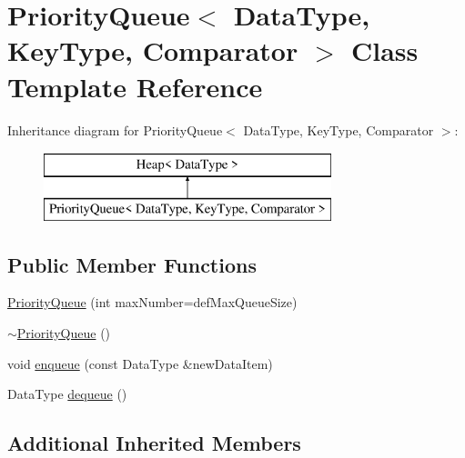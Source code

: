\hypertarget{class_priority_queue}{\section{Priority\+Queue$<$ Data\+Type, Key\+Type, Comparator $>$ Class Template Reference}
\label{class_priority_queue}
}
Inheritance diagram for Priority\+Queue$<$ Data\+Type, Key\+Type, Comparator $>$\+:\begin{figure}[H]
\begin{center}
\leavevmode
\includegraphics[height=2.000000cm]{class_priority_queue}
\end{center}
\end{figure}
\subsection*{Public Member Functions}
\begin{DoxyCompactItemize}
\item 
\hyperlink{class_priority_queue_a47de2a46cff1d6a6ed30a99c94dc1b14}{Priority\+Queue} (int max\+Number=def\+Max\+Queue\+Size)
\item 
\hyperlink{class_priority_queue_a7d959dc823b18c647aa0ee4a80f27881}{$\sim$\+Priority\+Queue} ()
\item 
void \hyperlink{class_priority_queue_a61f3339cf0e87c67ed004f8eff0a1bfa}{enqueue} (const Data\+Type \&new\+Data\+Item)
\item 
Data\+Type \hyperlink{class_priority_queue_a5bc758e313d6244e672ea6e81d695a46}{dequeue} ()
\end{DoxyCompactItemize}
\subsection*{Additional Inherited Members}


